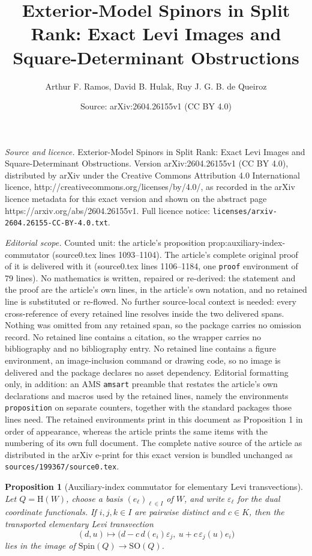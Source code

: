 \documentclass[10pt,a4paper]{amsart}
\title{Exterior-Model Spinors in Split Rank: Exact Levi Images and Square-Determinant Obstructions}
\author{Arthur F. Ramos, David B. Hulak, Ruy J. G. B. de Queiroz}
\date{Source: arXiv:2604.26155v1 (CC BY 4.0)}
\newtheorem{proposition}{Proposition}
\newcommand{\Hyp}{\mathrm{H}}
\newcommand{\SO}{\mathrm{SO}}
\newcommand{\Spin}{\mathrm{Spin}}
\begin{document}
\maketitle

\noindent\emph{Source and licence.} Exterior-Model Spinors in Split Rank: Exact Levi Images and Square-Determinant Obstructions. Version arXiv:2604.26155v1 (CC BY 4.0), distributed by arXiv under the Creative Commons Attribution 4.0 International licence, http://creativecommons.org/licenses/by/4.0/, as recorded in the arXiv licence metadata for this exact version and shown on the abstract page https://arxiv.org/abs/2604.26155v1. Full licence notice: \texttt{licenses/arxiv-2604.26155-CC-BY-4.0.txt}.\par\smallskip

\noindent\textit{Editorial scope.} Counted unit: the article's proposition prop:auxiliary-index-commutator (source0.tex lines 1093--1104). The article's complete original proof of it is delivered with it (source0.tex lines 1106--1184, one \texttt{proof} environment of 79 lines). No mathematics is written, repaired or re-derived: the statement and the proof are the article's own lines, in the article's own notation, and no retained line is substituted or re-flowed.  No further source-local context is needed: every cross-reference of every retained line resolves inside the two delivered spans.  Nothing was omitted from any retained span, so the package carries no omission record.  No retained line contains a citation, so the wrapper carries no bibliography and no bibliography entry.  No retained line contains a figure environment, an image-inclusion command or drawing code, so no image is delivered and the package declares no asset dependency.  Editorial formatting only, in addition: an AMS \texttt{amsart} preamble that restates the article's own declarations and macros used by the retained lines, namely the environments \texttt{proposition} on separate counters, together with the standard packages those lines need.  The retained environments print in this document as Proposition 1 in order of appearance, whereas the article prints the same items with the numbering of its own full document.  The complete native source of the article as distributed in the arXiv e-print for this exact version is bundled unchanged as \texttt{sources/199367/source0.tex}.
\begin{proposition}[Auxiliary-index commutator for elementary Levi transvections]
\label{prop:auxiliary-index-commutator}
Let \(Q=\Hyp(W)\), choose a basis \((e_\ell)_{\ell\in I}\) of \(W\), and
write \(\varepsilon_\ell\) for the dual coordinate functionals. If \(i,j,k\in I\)
are pairwise distinct and \(c\in K\), then the transported elementary Levi
transvection
\[
  (d,u)\longmapsto
  \bigl(d-c\,d(e_i)\varepsilon_j,\ u+c\,\varepsilon_j(u)e_i\bigr)
\]
lies in the image of \(\Spin(Q)\to\SO(Q)\).
\end{proposition}
\end{document}
